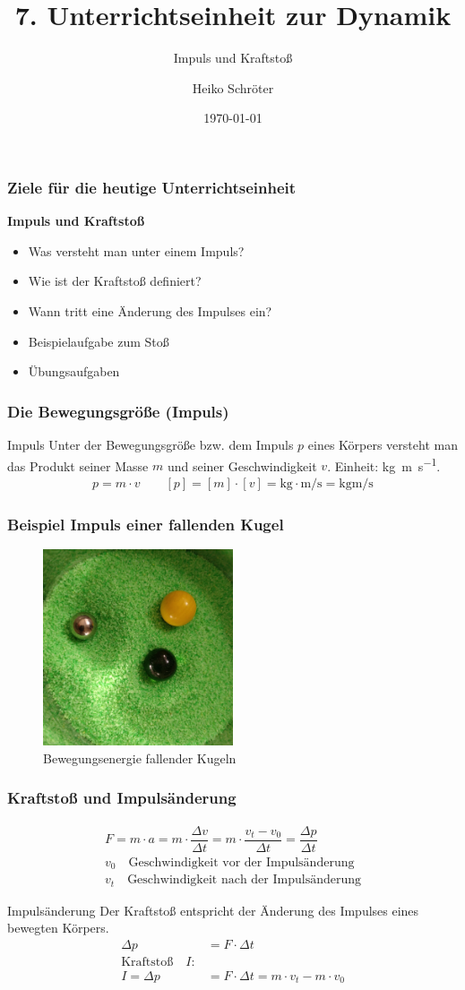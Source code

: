 \documentclass{article}
\title{7. Unterrichtseinheit zur Dynamik}
\subtitle{Impuls und Kraftstoß}
\author{Heiko Schröter}
\date{\today}
\begin{document}
\frame{\titlepage}

\frame
{
  \frametitle{Ziele für die heutige Unterrichtseinheit}
  \textbf{Impuls und Kraftstoß}
  \begin{itemize}
	\item Was versteht man unter einem Impuls?
	\item Wie ist der Kraftstoß definiert?
	\item Wann tritt eine Änderung des Impulses ein?
	\item Beispielaufgabe zum Stoß
	\item Übungsaufgaben
  \end{itemize}
}

\frame
{
  \frametitle{Die Bewegungsgröße (Impuls)}
\begin{block}{Impuls}
Unter der Bewegungsgröße bzw. dem Impuls $p$ eines Körpers versteht man das Produkt seiner Masse $m$ und seiner Geschwindigkeit $v$. Einheit: \si{\kilogram\meter\per\second}.
\begin{align*}
p=m\cdot v\quad\quad [p]=[m]\cdot[v]=\si{\kilogram}\cdot\si{\meter\per\second}=\si{\kilogram\meter\per\second}
\end{align*}
\end{block}
}

\frame
{
  \frametitle{Beispiel Impuls einer fallenden Kugel}
      \begin{figure}
	  \includegraphics[width=0.5\textwidth]{Impuls}
	  \vspace{-3mm}
	  \caption{Bewegungsenergie fallender Kugeln}
   \end{figure}
}

\frame
{
  \frametitle{Kraftstoß und Impulsänderung}
\begin{align*}
F=m\cdot a=m\cdot\dfrac{\Delta v}{\Delta t}=m\cdot\dfrac{v_t-v_0}{\Delta t}=\dfrac{\Delta p}{\Delta t}\\
v_0\quad\text{Geschwindigkeit vor der Impulsänderung}\\
v_t\quad\text{Geschwindigkeit nach der Impulsänderung}
\end{align*}
\begin{block}{Impulsänderung}
Der Kraftstoß entspricht der Änderung des Impulses eines bewegten Körpers.
\begin{align*}
\Delta p&=F\cdot \Delta t\\
\text{Kraftstoß}\quad I:\\
I=\Delta p&=F\cdot \Delta t=m\cdot v_t - m\cdot v_0
\end{align*}
\end{block}
}
\end{document}
